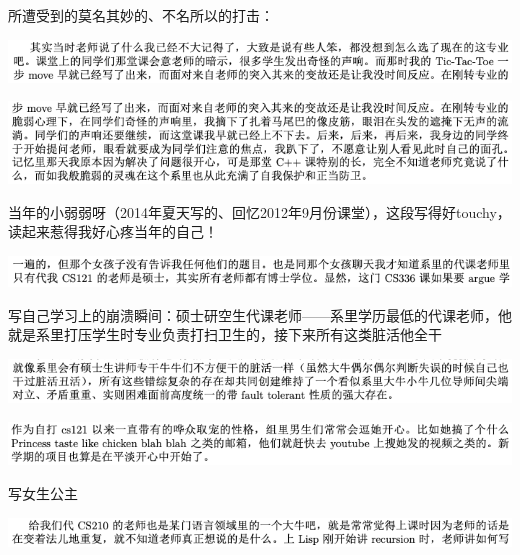 \documentclass[9pt, b5paper]{article}
\begin{document}
所遭受到的莫名其妙的、不名所以的打击：

\begin{center}
\includegraphics[width=.9\linewidth]{./pic/backups_plans_20210424_203548.png}
\end{center}

\begin{center}
\includegraphics[width=.9\linewidth]{./pic/backups_plans_20210424_203612.png}
\end{center}

当年的小弱弱呀（2014年夏天写的、回忆2012年9月份课堂），这段写得好touchy，读起来惹得我好心疼当年的自己！

\begin{center}
\includegraphics[width=.9\linewidth]{./pic/backups_plans_20210424_210229.png}
\end{center}

写自己学习上的崩溃瞬间：硕士研空生代课老师——系里学历最低的代课老师，他就是系里打压学生时专业负责打扫卫生的，接下来所有这类脏活他全干

\begin{center}
\includegraphics[width=.9\linewidth]{./pic/backups_plans_20210424_155915.png}
\end{center}

\begin{center}
\includegraphics[width=.9\linewidth]{./pic/backups_plans_20210424_160112.png}
\end{center}

写女生公主


\begin{center}
\includegraphics[width=.9\linewidth]{./pic/backups_plans_20210424_203858.png}
\end{center}
\end{document}
